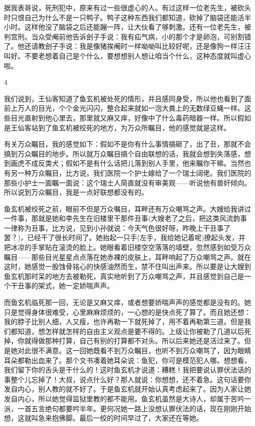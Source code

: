 据我表哥说，死刑犯中，原来有过一些很虚心的人。有过这样一位老先生，被砍头时只恨自己为什么不是一只鸭子。鸭子这种东西我们都知道，砍掉了脑袋还能活半小时。这样他没了脑袋之后还能蹦一阵，让大伙看了够刺激。还有一位老先生，被判宫刑。当众受阉前他告诉刽子手说：我有疝气病，小的那个才是卵泡，可别割错了。他还请教刽子手说：我是像猪挨阉时一样呦呦叫比较好呢，还是像狗一样汪汪叫好。不要老想着自己是个什么，要想想别人想让咱当个什么，这种态度就叫虚心啦。 

4 

我们说到，王仙客知道了鱼玄机被处死的情形，并且感同身受，所以他也看到了面前上万人的目光，个个金光闪闪，整合起来就如一泡大粪上的无数绿豆蝇一样。这些目光直射到他心里去，那里就又麻又痒，好像中了什么毒药暗器一样。所以假如是王仙客站到了鱼玄机被绞死的地方，为万众所瞩目，他的感觉就是这样。 

有关万众瞩目，我的感觉如下：假如不是你有什么事情搞砸了，出了丑，那就不会搞到万众瞩目的地步。所以就万众瞩目搞个自由联想的话，我就会想到失落感，想到画虎不成反类犬；假如不是有什么话把儿落到别人手里，他来瞩你干嘛。当然也有另一种万众瞩目，比方说，我们医院一个护士嫁给了一个瑞士阔佬。我们医院的那些小护士一面瞩一面说：这个瑞士人简直就没有审美观——听说他有兽奸倾向。所以说到万众瞩目，我是一点好联想都没有的。 

鱼玄机被绞死之前，眼前不但是万众嘱目，耳畔还有万众嘲骂之声。大嫂给我讲过一件事，那就是她和李先生在旧楼里干那件丑事(大嫂老了之后，把这类风流韵事一律称为丑事，比方说，见到小孙就说：今天气色很好呀，昨晚上干丑事了罢？)，已经干了很长时间了。她抬起一只手(左手，我给她记着呢)撩起头发，并把冰凉的手掌贴在滚烫的脸上。她眼看着旧楼空空落落的墙壁，忽然感到如受万众瞩目——那些目光星星点点落在她赤裸的皮肤上，耳畔响起了万众嘲骂之声。就在这时，她感觉一股蚀骨铭心的快感油然而生，禁不住叫出声来。所以要是让大嫂到鱼玄机那时呆的地方去被勒死，真实地听到了万众嘲骂之声，并且感觉到自己是一个干丑事的架式，她一定娇喘声声。 

而鱼玄机临死那一回，无论是又麻又痒，或者想要娇喘声声的感觉都是没有的。她只是觉得身体很难受，心里麻麻烦烦的，一心想的是快点死了算了。而且她还想：我的脖子比别人细，人又瘦，也许再勒一下就死掉了，用不着再勒第三道。但是我们都知道，想怎样就怎样的自由主义观点是要不得的。上级让你被勒了几道以后死掉，你就得做那种打算，自己有别的打算都不对头。所以后来她还是活过来了。但是她对此很不满意。这一回她既看不到万众瞩目，也听不到万众嘲骂了，因为眼睛耳朵都勒出血来了。那个文书凑着她耳朵说：鱼犯，你可是模范犯人哪。想想看，我们留下你的舌头是干什么的！这时鱼玄机才说道：糟糕！我把要说认罪伏法话的事整个儿忘掉了！大叔，说点什么好？那人就说：你想想，还不着急。这句话要你发自内心，别人教的就不好了。于是鱼玄机就开始认真考虑起来了。因为人家让她发自内心，所以她觉得监狱里教的都不能用。鱼玄机虽然是大诗人，却属于苦吟一派，一首五言绝句都要吟半年。更何况她一路上没想认罪伏法的话，现在刚刚开始想，这就叫急来抱佛脚。最后一绞的时间早过了，大家还在等她。 

